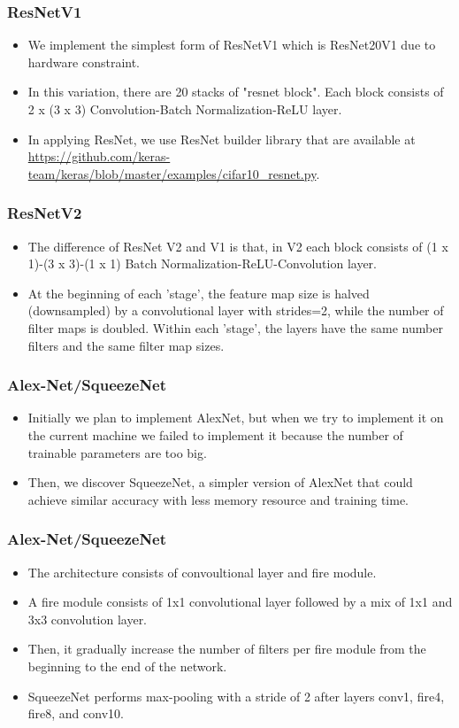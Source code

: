 \documentclass{beamer}
\begin{document}
\begin{frame}\frametitle{ResNetV1}
\begin{itemize}
	\item We implement the simplest form of ResNetV1 which is ResNet20V1 due to hardware constraint.   
	\item In this variation, there are 20 stacks of "resnet block". Each block consists of 2 x (3 x 3) Convolution-Batch Normalization-ReLU layer.
	\item In applying ResNet, we use ResNet builder library that are available at \href{https://github.com/keras-team/keras/blob/master/examples/cifar10\_resnet.py}{https://github.com/keras-team/keras/blob/master/examples/cifar10\_resnet.py}.
\end{itemize} 
\end{frame}
\begin{frame}\frametitle{ResNetV2}
\begin{itemize}
	\item  The difference of ResNet V2 and V1 is that, in V2 each block consists of  (1 x 1)-(3 x 3)-(1 x 1) Batch Normalization-ReLU-Convolution layer. 
	\item At the beginning of each 'stage', the feature map size is halved (downsampled) by a convolutional layer with strides=2, while the number of filter maps is doubled. Within each 'stage', the layers have the same number filters and the
	same filter map sizes. 
\end{itemize} 
\end{frame}
\begin{frame}\frametitle{Alex-Net/SqueezeNet}
\begin{itemize}
	\item Initially we plan to implement AlexNet, but when we try to implement it on the current machine we failed to implement it because the number of trainable parameters are too big. 
	\item Then, we discover SqueezeNet, a simpler version of AlexNet that could achieve similar accuracy with less memory resource and training time. 
\end{itemize} 
\end{frame}
\begin{frame}\frametitle{Alex-Net/SqueezeNet}
\begin{itemize}
	\item The architecture consists of convoultional layer and fire module.  
	\item  A fire module consists of 1x1 convolutional layer followed by a mix of 1x1 and 3x3 convolution layer.
	\item Then, it gradually increase the number of filters per fire module from the beginning to the end of the network.
	\item SqueezeNet performs max-pooling with a stride of 2 after layers conv1, fire4, fire8, and conv10.
\end{itemize} 
\end{frame}
\end{document}
